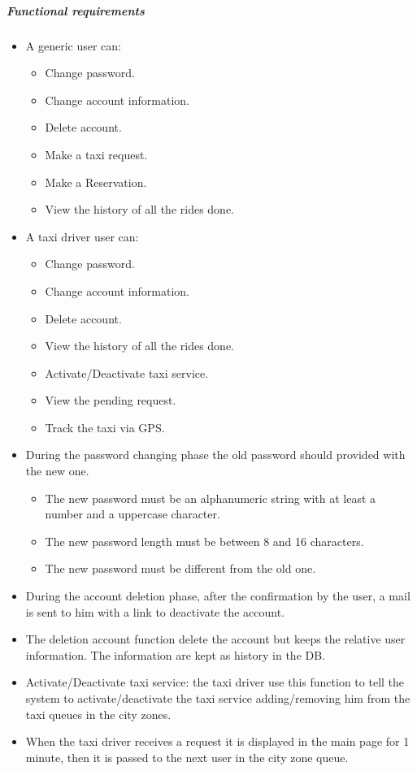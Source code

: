     \subparagraph{Functional requirements}
    \begin{itemize}
        \item A generic user can:
            \begin{itemize}
                \item Change password.
                \item Change account information.
                \item Delete account.
                \item Make a taxi request.
                \item Make a Reservation.
                \item View the history of all the rides done.
            \end{itemize}
        \item A taxi driver user can:
            \begin{itemize}
                \item Change password.
                \item Change account information.
                \item Delete account.
                \item View the history of all the rides done.
                \item Activate/Deactivate taxi service.
                \item View the pending request.
                \item Track the taxi via GPS.
            \end{itemize}
        
        \item During the password changing phase the old password should provided with the new one.
            \begin{itemize}
                \item The new password must be an alphanumeric string with at least a number and a uppercase character.
                \item The new password length must be between 8 and 16 characters. 
                \item The new password must be different from the old one.
            \end{itemize}
        \item During the account deletion phase, after the confirmation by the user, a mail is sent to him with a link to deactivate the account.
        \item The deletion account function delete the account but keeps the relative user information. The information are kept as history in the DB.
        \item Activate/Deactivate taxi service: the taxi driver use this function to tell the system to activate/deactivate the taxi service adding/removing him from the taxi queues in the city zones.
        \item When the taxi driver receives a request it is displayed in the main page for 1 minute, then it is passed to the next user in the city zone queue.
    \end{itemize}
        


